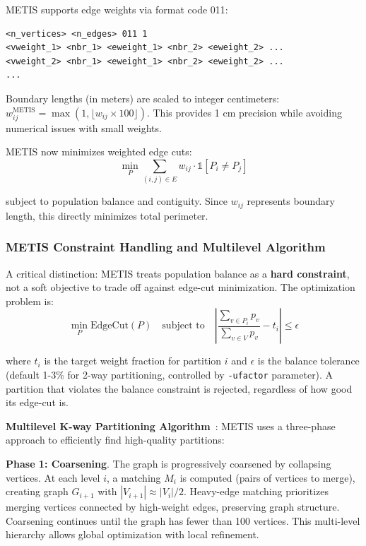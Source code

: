 METIS supports edge weights via format code 011:
\begin{verbatim}
<n_vertices> <n_edges> 011 1
<vweight_1> <nbr_1> <eweight_1> <nbr_2> <eweight_2> ...
<vweight_2> <nbr_1> <eweight_1> <nbr_2> <eweight_2> ...
...
\end{verbatim}

Boundary lengths (in meters) are scaled to integer centimeters: $w_{ij}^{\text{METIS}} = \max(1, \lfloor w_{ij} \times 100 \rfloor)$. This provides 1 cm precision while avoiding numerical issues with small weights.

METIS now minimizes weighted edge cuts:
\[
\min_{P} \sum_{(i,j) \in E} w_{ij} \cdot \mathbb{1}[P_i \neq P_j]
\]

subject to population balance and contiguity. Since $w_{ij}$ represents boundary length, this directly minimizes total perimeter.

\subsubsection{METIS Constraint Handling and Multilevel Algorithm}

A critical distinction: METIS treats population balance as a \textbf{hard constraint}, not a soft objective to trade off against edge-cut minimization. The optimization problem is:
\[
\min_{P} \text{EdgeCut}(P) \quad \text{subject to} \quad \left|\frac{\sum_{v \in P_i} p_v}{\sum_{v \in V} p_v} - t_i\right| \leq \epsilon
\]

where $t_i$ is the target weight fraction for partition $i$ and $\epsilon$ is the balance tolerance (default 1-3\% for 2-way partitioning, controlled by \texttt{-ufactor} parameter). A partition that violates the balance constraint is rejected, regardless of how good its edge-cut is.

\textbf{Multilevel K-way Partitioning Algorithm}~\cite{karypis1998fast,karypis1998multilevel}: METIS uses a three-phase approach to efficiently find high-quality partitions:

\textbf{Phase 1: Coarsening}. The graph is progressively coarsened by collapsing vertices. At each level $i$, a matching $M_i$ is computed (pairs of vertices to merge), creating graph $G_{i+1}$ with $|V_{i+1}| \approx |V_i|/2$. Heavy-edge matching prioritizes merging vertices connected by high-weight edges, preserving graph structure. Coarsening continues until the graph has fewer than 100 vertices. This multi-level hierarchy allows global optimization with local refinement.

